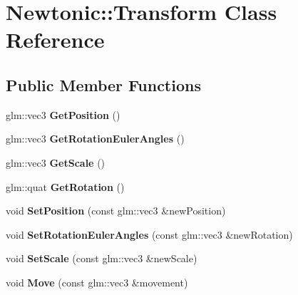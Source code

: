 \hypertarget{classNewtonic_1_1Transform}{}\section{Newtonic\+::Transform Class Reference}
\label{classNewtonic_1_1Transform}
\subsection*{Public Member Functions}
\begin{DoxyCompactItemize}
\item 
\mbox{\label{classNewtonic_1_1Transform_ad90314843be77ed46817e7e95705ab26}} 
glm\+::vec3 {\bfseries Get\+Position} ()
\item 
\mbox{\label{classNewtonic_1_1Transform_a2283c5fd116747efbc17bcb8c88c8b2d}} 
glm\+::vec3 {\bfseries Get\+Rotation\+Euler\+Angles} ()
\item 
\mbox{\label{classNewtonic_1_1Transform_a5eb6df6ef7641e60a5419754dfebf991}} 
glm\+::vec3 {\bfseries Get\+Scale} ()
\item 
\mbox{\label{classNewtonic_1_1Transform_aa46a1b134b4d2e3f39263a6921612f45}} 
glm\+::quat {\bfseries Get\+Rotation} ()
\item 
\mbox{\label{classNewtonic_1_1Transform_ab1cd7b5b520d8d8bff22798f55052819}} 
void {\bfseries Set\+Position} (const glm\+::vec3 \&new\+Position)
\item 
\mbox{\label{classNewtonic_1_1Transform_a9c1738af2c86e85a068e8a688698badb}} 
void {\bfseries Set\+Rotation\+Euler\+Angles} (const glm\+::vec3 \&new\+Rotation)
\item 
\mbox{\label{classNewtonic_1_1Transform_a05fd09998346da0f5e9dab39d73301ac}} 
void {\bfseries Set\+Scale} (const glm\+::vec3 \&new\+Scale)
\item 
\mbox{\label{classNewtonic_1_1Transform_a998461993568cd4878594dc3f1aee703}} 
void {\bfseries Move} (const glm\+::vec3 \&movement)

\end{DoxyCompactItemize}
